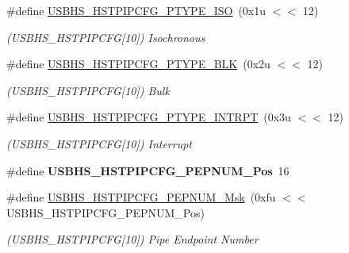\begin{DoxyCompactItemize}
\#define \mbox{\hyperlink{group__SAMV71__USBHS_ga6b03ffb635a9a12458fc316d49bfb18e}{U\+S\+B\+H\+S\+\_\+\+H\+S\+T\+P\+I\+P\+C\+F\+G\+\_\+\+P\+T\+Y\+P\+E\+\_\+\+I\+SO}}~(0x1u $<$$<$ 12)
\begin{DoxyCompactList}\small\item\em (U\+S\+B\+H\+S\+\_\+\+H\+S\+T\+P\+I\+P\+C\+FG\mbox{[}10\mbox{]}) Isochronous \end{DoxyCompactList}\item 
\mbox{\label{group__SAMV71__USBHS_ga5d745287ca3ffa08bf8a024ee2217c94}} 
\#define \mbox{\hyperlink{group__SAMV71__USBHS_ga5d745287ca3ffa08bf8a024ee2217c94}{U\+S\+B\+H\+S\+\_\+\+H\+S\+T\+P\+I\+P\+C\+F\+G\+\_\+\+P\+T\+Y\+P\+E\+\_\+\+B\+LK}}~(0x2u $<$$<$ 12)
\begin{DoxyCompactList}\small\item\em (U\+S\+B\+H\+S\+\_\+\+H\+S\+T\+P\+I\+P\+C\+FG\mbox{[}10\mbox{]}) Bulk \end{DoxyCompactList}\item 
\mbox{\label{group__SAMV71__USBHS_ga01cade33091230dcb050c23aadee6dde}} 
\#define \mbox{\hyperlink{group__SAMV71__USBHS_ga01cade33091230dcb050c23aadee6dde}{U\+S\+B\+H\+S\+\_\+\+H\+S\+T\+P\+I\+P\+C\+F\+G\+\_\+\+P\+T\+Y\+P\+E\+\_\+\+I\+N\+T\+R\+PT}}~(0x3u $<$$<$ 12)
\begin{DoxyCompactList}\small\item\em (U\+S\+B\+H\+S\+\_\+\+H\+S\+T\+P\+I\+P\+C\+FG\mbox{[}10\mbox{]}) Interrupt \end{DoxyCompactList}\item 
\mbox{\label{group__SAMV71__USBHS_gaa9d97ab3406c0f2e769a229c85a14ec6}} 
\#define {\bfseries U\+S\+B\+H\+S\+\_\+\+H\+S\+T\+P\+I\+P\+C\+F\+G\+\_\+\+P\+E\+P\+N\+U\+M\+\_\+\+Pos}~16
\item 
\mbox{\label{group__SAMV71__USBHS_gae4c427ae7b00860d3e38d2fb3a3b1cd5}} 
\#define \mbox{\hyperlink{group__SAMV71__USBHS_gae4c427ae7b00860d3e38d2fb3a3b1cd5}{U\+S\+B\+H\+S\+\_\+\+H\+S\+T\+P\+I\+P\+C\+F\+G\+\_\+\+P\+E\+P\+N\+U\+M\+\_\+\+Msk}}~(0xfu $<$$<$ U\+S\+B\+H\+S\+\_\+\+H\+S\+T\+P\+I\+P\+C\+F\+G\+\_\+\+P\+E\+P\+N\+U\+M\+\_\+\+Pos)
\begin{DoxyCompactList}\small\item\em (U\+S\+B\+H\+S\+\_\+\+H\+S\+T\+P\+I\+P\+C\+FG\mbox{[}10\mbox{]}) Pipe Endpoint Number \end{DoxyCompactList}\item 

\end{DoxyCompactItemize}
